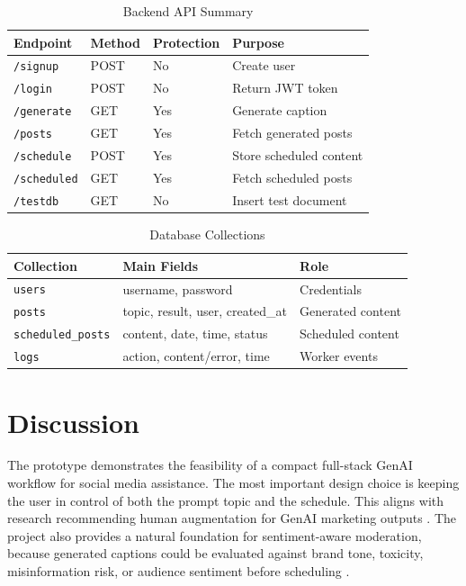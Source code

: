 \documentclass[conference]{IEEEtran}
\begin{document}
\begin{table}[!t]
\caption{Backend API Summary}
\label{tab:api}
\centering
\scriptsize
\begin{tabular}{llll}
\toprule
Endpoint & Method & Protection & Purpose\\
\midrule
\texttt{/signup} & POST & No & Create user\\
\texttt{/login} & POST & No & Return JWT token\\
\texttt{/generate} & GET & Yes & Generate caption\\
\texttt{/posts} & GET & Yes & Fetch generated posts\\
\texttt{/schedule} & POST & Yes & Store scheduled content\\
\texttt{/scheduled} & GET & Yes & Fetch scheduled posts\\
\texttt{/testdb} & GET & No & Insert test document\\
\bottomrule
\end{tabular}
\end{table}

\begin{table}[!t]
\caption{Database Collections}
\label{tab:collections}
\centering
\scriptsize
\begin{tabular}{lll}
\toprule
Collection & Main Fields & Role\\
\midrule
\texttt{users} & username, password & Credentials\\
\texttt{posts} & topic, result, user, created\_at & Generated content\\
\texttt{scheduled\_posts} & content, date, time, status & Scheduled content\\
\texttt{logs} & action, content/error, time & Worker events\\
\bottomrule
\end{tabular}
\end{table}

\section{Discussion}

The prototype demonstrates the feasibility of a compact full-stack GenAI workflow for social media assistance. The most important design choice is keeping the user in control of both the prompt topic and the schedule. This aligns with research recommending human augmentation for GenAI marketing outputs \cite{grewal2025}. The project also provides a natural foundation for sentiment-aware moderation, because generated captions could be evaluated against brand tone, toxicity, misinformation risk, or audience sentiment before scheduling \cite{krugmann2024,govindankutty2024}.
\end{document}
